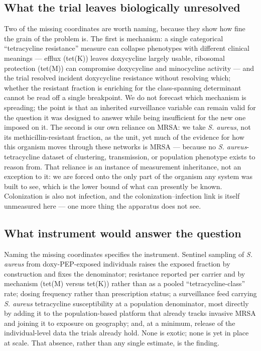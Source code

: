 \documentclass[10pt,letterpaper]{article}
\begin{document}
\subsection*{What the trial leaves biologically unresolved}

Two of the missing coordinates are worth naming, because they show how
fine the grain of the problem is. The first is mechanism: a single
categorical ``tetracycline resistance'' measure can collapse phenotypes
with different clinical meanings --- efflux (tet(K)) leaves doxycycline
largely usable, ribosomal protection (tet(M)) can compromise doxycycline and minocycline activity \cite{liu2011, grossman2016} --- and the trial
resolved incident doxycycline resistance without resolving which;
whether the resistant fraction is enriching for the class-spanning
determinant cannot be read off a single breakpoint. We do not forecast
which mechanism is spreading; the point is that an inherited
surveillance variable can remain valid for the question it was designed
to answer while being insufficient for the new one imposed on it. The
second is our own reliance on MRSA: we take \emph{S. aureus}, not its
methicillin-resistant fraction, as the unit, yet much of the evidence
for how this organism moves through these networks is MRSA --- because
no \emph{S. aureus}-tetracycline dataset of clustering, transmission, or
population phenotype exists to reason from. That reliance is an instance
of measurement inheritance, not an exception to it: we are forced onto
the only part of the organism any system was built to see, which is the
lower bound of what can presently be known. Colonization is also not
infection, and the colonization--infection link is itself unmeasured
here --- one more thing the apparatus does not see.

\subsection*{What instrument would answer the question}

Naming the missing coordinates specifies the instrument. Sentinel
sampling of \emph{S. aureus} from doxy-PEP-exposed individuals raises
the exposed fraction by construction and fixes the denominator;
resistance reported per carrier and by mechanism (tet(M) versus tet(K))
rather than as a pooled ``tetracycline-class'' rate; dosing frequency
rather than prescription status; a surveillance feed carrying \emph{S.
aureus} tetracycline susceptibility at a population denominator, most
directly by adding it to the population-based platform that already
tracks invasive MRSA and joining it to exposure on geography; and, at a
minimum, release of the individual-level data the trials already hold.
None is exotic; none is yet in place at scale. That absence, rather than
any single estimate, is the finding.
\end{document}
